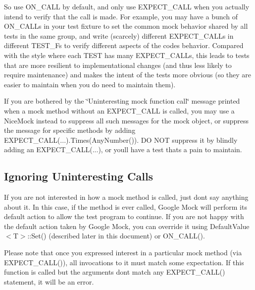 So use {\ttfamily O\+N\+\_\+\+C\+A\+LL} by default, and only use {\ttfamily E\+X\+P\+E\+C\+T\+\_\+\+C\+A\+LL} when you actually intend to verify that the call is made. For example, you may have a bunch of {\ttfamily O\+N\+\_\+\+C\+A\+LL}s in your test fixture to set the common mock behavior shared by all tests in the same group, and write (scarcely) different {\ttfamily E\+X\+P\+E\+C\+T\+\_\+\+C\+A\+LL}s in different {\ttfamily T\+E\+S\+T\+\_\+F}s to verify different aspects of the code\textquotesingle{}s behavior. Compared with the style where each {\ttfamily T\+E\+ST} has many {\ttfamily E\+X\+P\+E\+C\+T\+\_\+\+C\+A\+LL}s, this leads to tests that are more resilient to implementational changes (and thus less likely to require maintenance) and makes the intent of the tests more obvious (so they are easier to maintain when you do need to maintain them).

If you are bothered by the \char`\"{}\+Uninteresting mock function call\char`\"{} message printed when a mock method without an {\ttfamily E\+X\+P\+E\+C\+T\+\_\+\+C\+A\+LL} is called, you may use a {\ttfamily Nice\+Mock} instead to suppress all such messages for the mock object, or suppress the message for specific methods by adding {\ttfamily E\+X\+P\+E\+C\+T\+\_\+\+C\+A\+L\+L(...).Times(\+Any\+Number())}. DO N\+OT suppress it by blindly adding an {\ttfamily E\+X\+P\+E\+C\+T\+\_\+\+C\+A\+L\+L(...)}, or you\textquotesingle{}ll have a test that\textquotesingle{}s a pain to maintain.

\subsection*{Ignoring Uninteresting Calls}

If you are not interested in how a mock method is called, just don\textquotesingle{}t say anything about it. In this case, if the method is ever called, Google Mock will perform its default action to allow the test program to continue. If you are not happy with the default action taken by Google Mock, you can override it using {\ttfamily Default\+Value$<$T$>$\+::\+Set()} (described later in this document) or {\ttfamily O\+N\+\_\+\+C\+A\+L\+L()}.

Please note that once you expressed interest in a particular mock method (via {\ttfamily E\+X\+P\+E\+C\+T\+\_\+\+C\+A\+L\+L()}), all invocations to it must match some expectation. If this function is called but the arguments don\textquotesingle{}t match any {\ttfamily E\+X\+P\+E\+C\+T\+\_\+\+C\+A\+L\+L()} statement, it will be an error.

